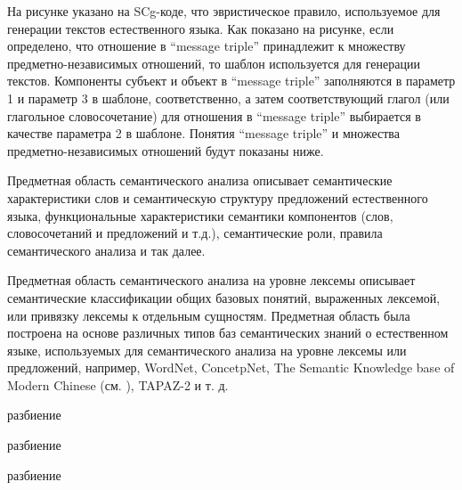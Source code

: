 На рисунке \textit{} указано на SCg-коде, что эвристическое правило, используемое для генерации текстов естественного языка. Как показано на рисунке, если определено, что отношение в ``message triple'' принадлежит к множеству предметно-независимых отношений, то шаблон используется для генерации текстов. Компоненты субъект и объект в ``message triple'' заполняются в параметр 1 и параметр 3 в шаблоне, соответственно, а затем соответствующий глагол (или глагольное словосочетание) для отношения в ``message triple'' выбирается в качестве параметра 2 в шаблоне. Понятия ``message triple'' и множества предметно-независимых отношений будут показаны ниже.

Предметная область семантического анализа описывает семантические характеристики слов и семантическую структуру предложений естественного языка, функциональные характеристики семантики компонентов (слов, словосочетаний и предложений и т.д.), семантические роли, правила семантического анализа и так далее.

Предметная область семантического анализа на уровне лексемы описывает семантические классификации общих базовых понятий, выраженных лексемой, или привязку лексемы к отдельным сущностям. Предметная область была построена на основе различных типов баз семантических знаний о естественном языке, используемых для семантического анализа на уровне лексемы или предложений, например, WordNet, ConcetpNet, The Semantic Knowledge base of Modern Chinese (см. ), TAPAZ-2 и т. д.

\begin{SCn}
\end{SCn}


\begin{SCn}
	\begin{scnrelfromset}{разбиение}
		\begin{scnindent}
			\begin{scnrelfromset}{разбиение}
			\end{scnrelfromset}
		\end{scnindent}
		\scnitem {объект*}
		\begin{scnindent}
			\begin{scnrelfromset}{разбиение}
				\scnitem {покрытие*}
				\scnitem {корпус*}
				\scnitem {прослойка*}
				\scnitem {сердцевина*}
			\end{scnrelfromset}
		\end{scnindent}
	\end{scnrelfromset}
\end{SCn}

